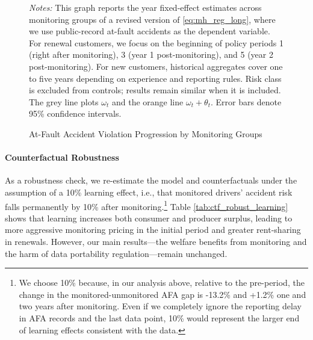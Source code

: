\begin{figure}[H]
\centering
{}
\caption{At-Fault Accident Violation Progression by Monitoring Groups \label{fig:rf-mh-viol}}
\begin{minipage}{0.95\textwidth} %
    {\footnotesize \emph{Notes: }
    This graph reports the year fixed-effect estimates across monitoring groups of a revised version of \cref{eq:mh_reg_long}, where we use public-record at-fault accidents as the dependent variable. For renewal customers, we focus on the beginning of policy periods 1 (right after monitoring), 3 (year 1 post-monitoring), and 5 (year 2 post-monitoring). For new customers, historical aggregates cover one to five years depending on experience and reporting rules. Risk class is excluded from controls; results remain similar when it is included. The grey line plots $\omega_t$ and the orange line $\omega_t + \theta_t$. Error bars denote 95\% confidence intervals.\par}
\end{minipage}
\end{figure}

\paragraph{Counterfactual Robustness}

As a robustness check, we re-estimate the model and counterfactuals under the assumption of a 10\% learning effect, i.e., that monitored drivers' accident risk falls permanently by 10\% after monitoring.\footnote{We choose 10\% because, in our analysis above, relative to the pre-period, the change in the monitored-unmonitored AFA gap is -13.2\% and +1.2\% one and two years after monitoring. Even if we completely ignore the reporting delay in AFA records and the last data point, 10\% would represent the larger end of learning effects consistent with the data.} Table \ref{tab:ctf_robust_learning} shows that learning increases both consumer and producer surplus, leading to more aggressive monitoring pricing in the initial period and greater rent-sharing in renewals. However, our main results---the welfare benefits from monitoring and the harm of data portability regulation---remain unchanged.


\vspace{-1em}
